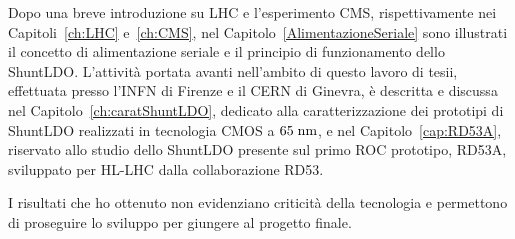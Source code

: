 Dopo una breve introduzione su LHC e l'esperimento CMS, rispettivamente nei Capitoli~\ref{ch:LHC} e~\ref{ch:CMS}, nel Capitolo~\ref{AlimentazioneSeriale} sono illustrati il concetto di alimentazione seriale e il principio di funzionamento dello ShuntLDO. L'attivit\`a portata avanti nell'ambito di questo lavoro di tesii, effettuata presso l'INFN di Firenze e il CERN di Ginevra, \`e descritta e discussa nel  Capitolo~\ref{ch:caratShuntLDO}, dedicato alla caratterizzazione dei prototipi di ShuntLDO realizzati in tecnologia CMOS a $65\rm \; nm$, e nel Capitolo~\ref{cap:RD53A}, riservato allo studio dello ShuntLDO presente sul primo ROC prototipo, RD53A, sviluppato per HL-LHC dalla collaborazione RD53.

I risultati che ho ottenuto non evidenziano criticit\`a della tecnologia e permettono di proseguire lo sviluppo per giungere al progetto finale.




